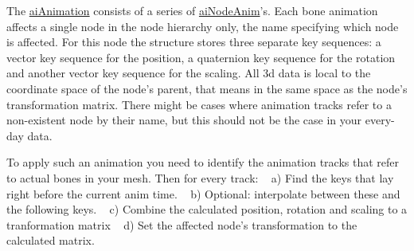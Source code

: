 The \hyperlink{structai_animation}{ai\+Animation} consists of a series of \hyperlink{structai_node_anim}{ai\+Node\+Anim}'s. Each bone animation affects a single node in the node hierarchy only, the name specifying which node is affected. For this node the structure stores three separate key sequences\+: a vector key sequence for the position, a quaternion key sequence for the rotation and another vector key sequence for the scaling. All 3d data is local to the coordinate space of the node's parent, that means in the same space as the node's transformation matrix. There might be cases where animation tracks refer to a non-\/existent node by their name, but this should not be the case in your every-\/day data.

To apply such an animation you need to identify the animation tracks that refer to actual bones in your mesh. Then for every track\+: ~\newline
 a) Find the keys that lay right before the current anim time. ~\newline
 b) Optional\+: interpolate between these and the following keys. ~\newline
 c) Combine the calculated position, rotation and scaling to a tranformation matrix ~\newline
 d) Set the affected node's transformation to the calculated matrix. ~\newline


